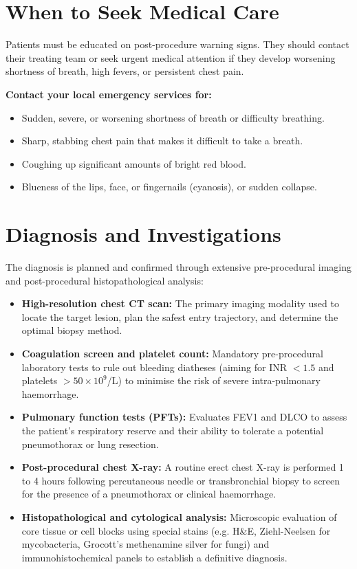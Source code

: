 \section*{When to Seek Medical Care}
Patients must be educated on post-procedure warning signs. They should contact their treating team or seek urgent medical attention if they develop worsening shortness of breath, high fevers, or persistent chest pain.

\textbf{Contact your local emergency services for:}
\begin{itemize}
    \item Sudden, severe, or worsening shortness of breath or difficulty breathing.
    \item Sharp, stabbing chest pain that makes it difficult to take a breath.
    \item Coughing up significant amounts of bright red blood.
    \item Blueness of the lips, face, or fingernails (cyanosis), or sudden collapse.
\end{itemize}

\section*{Diagnosis and Investigations}
The diagnosis is planned and confirmed through extensive pre-procedural imaging and post-procedural histopathological analysis:
\begin{itemize}
    \item \textbf{High-resolution chest CT scan:} The primary imaging modality used to locate the target lesion, plan the safest entry trajectory, and determine the optimal biopsy method.
    \item \textbf{Coagulation screen and platelet count:} Mandatory pre-procedural laboratory tests to rule out bleeding diatheses (aiming for INR $<1.5$ and platelets $>50 \times 10^9$/L) to minimise the risk of severe intra-pulmonary haemorrhage.
    \item \textbf{Pulmonary function tests (PFTs):} Evaluates FEV1 and DLCO to assess the patient's respiratory reserve and their ability to tolerate a potential pneumothorax or lung resection.
    \item \textbf{Post-procedural chest X-ray:} A routine erect chest X-ray is performed 1 to 4 hours following percutaneous needle or transbronchial biopsy to screen for the presence of a pneumothorax or clinical haemorrhage.
    \item \textbf{Histopathological and cytological analysis:} Microscopic evaluation of core tissue or cell blocks using special stains (e.g. H\&E, Ziehl-Neelsen for mycobacteria, Grocott's methenamine silver for fungi) and immunohistochemical panels to establish a definitive diagnosis.
\end{itemize}

